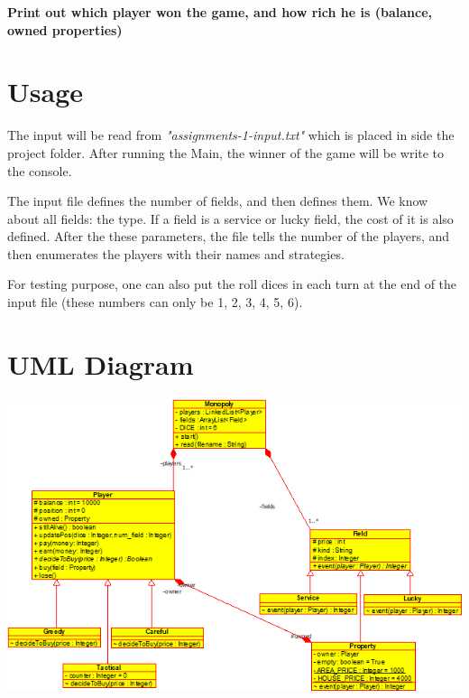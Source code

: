 \documentclass[a4paper, 12pt]{report}
\begin{document}
\textbf{Print out which player won the game, and how rich he is (balance, owned properties)}

\chapter{Usage}

The input will be read from \textit{"assignments-1-input.txt"} which is placed in side the project folder. After running the Main, the winner of the game will be write to the console.

The input file defines the number of fields, and then defines them. We know about all fields: the type. If a field is a service or lucky field, the cost of it is also defined. After the these parameters, the file tells the number of the players, and then enumerates the players with their names and strategies.

For testing purpose, one can also put the roll dices in each turn at the end of the input file (these numbers can only be {1, 2, 3, 4, 5, 6}).

\chapter{UML Diagram}
\includegraphics[scale=1.0]{classdiagram.png}

\end{document}
